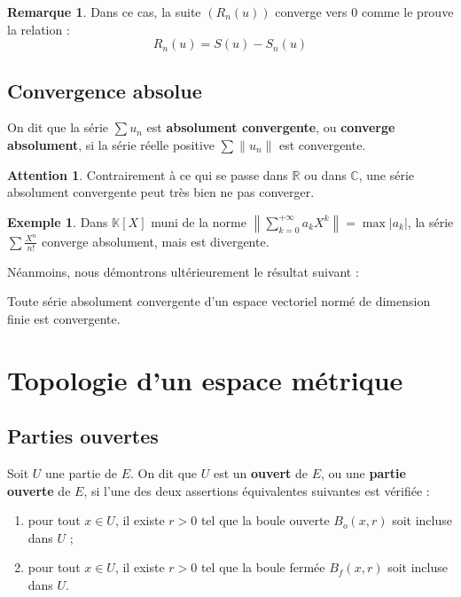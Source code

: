 \documentclass[french]{article}
\newcommand{\R}{\mathbb{R}}
\newcommand{\C}{\mathbb{C}}
\newcommand{\K}{\mathbb{K}}
\theoremstyle{plain}
\theoremstyle{definition}
\newtheorem*{ex}{Exemple}
\newtheorem*{rmq}{Remarque}
\newtheorem*{attention}{Attention}
\theoremstyle{remark}
\begin{document}
\begin{rmq}
	Dans ce cas, la suite $(R_n(u))$ converge vers $0$ comme le prouve la relation : $$R_n(u)=S(u)-S_n(u)$$
\end{rmq}

\subsection{Convergence absolue}

\begin{dfn}
	On dit que la série $\displaystyle\sum u_n$ est \textbf{absolument convergente}, ou \textbf{converge absolument}, si la série réelle positive $\displaystyle\sum \lVert u_n\rVert$ est convergente.
\end{dfn}

\begin{attention}
	Contrairement à ce qui se passe dans $\R$ ou dans $\C$, une série absolument convergente peut très bien ne pas converger.
\end{attention}

\begin{ex}
	Dans $\K[X]$ muni de la norme $\displaystyle\left\lVert\sum_{k=0}^{+\infty}a_kX^k\right\rVert=\max\lvert a_k\rvert$, la série $\displaystyle\sum\frac{X^n}{n!}$ converge absolument, mais est divergente.
\end{ex}

Néanmoins, nous démontrons ultérieurement le résultat suivant :

\begin{thm}%
	Toute série absolument convergente d'un espace vectoriel normé de dimension finie est convergente.
\end{thm}

\section{Topologie d'un espace métrique}

\subsection{Parties ouvertes}

\begin{dfn}
	Soit $U$ une partie de $E$. On dit que $U$ est un \textbf{ouvert} de $E$, ou une \textbf{partie ouverte} de $E$, si l'une des deux assertions équivalentes suivantes est vérifiée :
	\begin{enumerate}[label=(\roman*)]
		\item pour tout $x\in U$, il existe $r>0$ tel que la boule ouverte $B_o(x,r)$ soit incluse dans $U$ ;
		\item pour tout $x\in U$, il existe $r>0$ tel que la boule fermée $B_f(x,r)$ soit incluse dans $U$.
	\end{enumerate}
\end{dfn}
\end{document}

